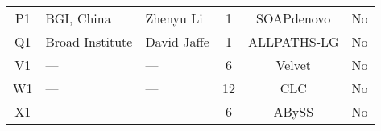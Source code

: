 \begin{table}
\begin{center}
\begin{tabular}{| c | p{1.5in} | l | c | c | l |}
      P1 &  BGI, China &  Zhenyu Li &  1 &  SOAPdenovo & No \\
      Q1 &  Broad Institute &  David Jaffe &  1 &  ALLPATHS-LG & No\\
      \hline\hline
      V1 &  --- &  --- &   6 & Velvet & No \\
      W1 &  --- &  --- &  12 & CLC & No \\
      X1 &  --- &  --- &   6 & ABySS & No\\
      \hline
    \end{tabular}
  \end{center}
  \label{table:participants}
\end{table}
